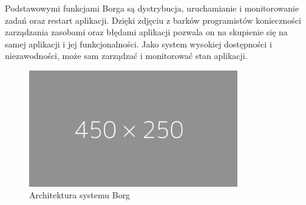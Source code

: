 \documentclass[12pt]{report}
\begin{document}
Podstawowymi funkcjami Borga są dystrybucja, uruchamianie i monitorowanie zadań oraz restart aplikacji. Dzięki zdjęciu z barków programistów konieczności zarządzania zasobami oraz błędami aplikacji pozwala on na skupienie się na samej aplikacji i jej funkcjonalności. Jako system wysokiej dostępności i niezawodności, może sam zarządzać i monitorować stan aplikacji.

\begin{figure}[h]
	\centering
	\includegraphics[width=0.81\textwidth]{images/placeholder-wide.png}
	\caption{Architektura systemu Borg}
\end{figure}
\end{document}
